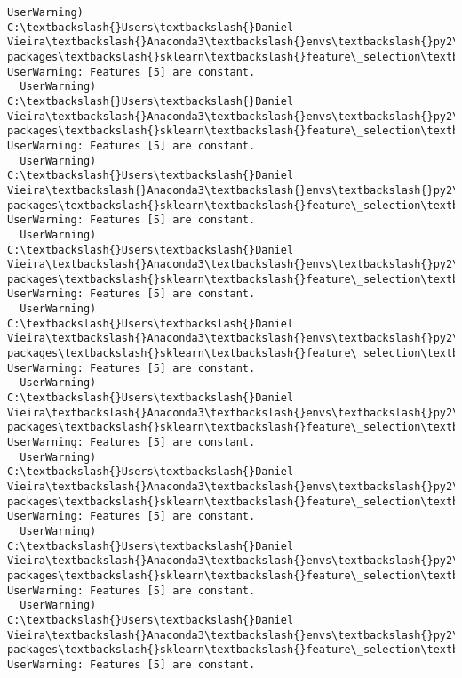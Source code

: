 \documentclass[11pt]{article}
\begin{document}
\begin{Verbatim}[commandchars=\\\{\}]
  UserWarning)
C:\textbackslash{}Users\textbackslash{}Daniel Vieira\textbackslash{}Anaconda3\textbackslash{}envs\textbackslash{}py2\textbackslash{}lib\textbackslash{}site-packages\textbackslash{}sklearn\textbackslash{}feature\_selection\textbackslash{}univariate\_selection.py:113: UserWarning: Features [5] are constant.
  UserWarning)
C:\textbackslash{}Users\textbackslash{}Daniel Vieira\textbackslash{}Anaconda3\textbackslash{}envs\textbackslash{}py2\textbackslash{}lib\textbackslash{}site-packages\textbackslash{}sklearn\textbackslash{}feature\_selection\textbackslash{}univariate\_selection.py:113: UserWarning: Features [5] are constant.
  UserWarning)
C:\textbackslash{}Users\textbackslash{}Daniel Vieira\textbackslash{}Anaconda3\textbackslash{}envs\textbackslash{}py2\textbackslash{}lib\textbackslash{}site-packages\textbackslash{}sklearn\textbackslash{}feature\_selection\textbackslash{}univariate\_selection.py:113: UserWarning: Features [5] are constant.
  UserWarning)
C:\textbackslash{}Users\textbackslash{}Daniel Vieira\textbackslash{}Anaconda3\textbackslash{}envs\textbackslash{}py2\textbackslash{}lib\textbackslash{}site-packages\textbackslash{}sklearn\textbackslash{}feature\_selection\textbackslash{}univariate\_selection.py:113: UserWarning: Features [5] are constant.
  UserWarning)
C:\textbackslash{}Users\textbackslash{}Daniel Vieira\textbackslash{}Anaconda3\textbackslash{}envs\textbackslash{}py2\textbackslash{}lib\textbackslash{}site-packages\textbackslash{}sklearn\textbackslash{}feature\_selection\textbackslash{}univariate\_selection.py:113: UserWarning: Features [5] are constant.
  UserWarning)
C:\textbackslash{}Users\textbackslash{}Daniel Vieira\textbackslash{}Anaconda3\textbackslash{}envs\textbackslash{}py2\textbackslash{}lib\textbackslash{}site-packages\textbackslash{}sklearn\textbackslash{}feature\_selection\textbackslash{}univariate\_selection.py:113: UserWarning: Features [5] are constant.
  UserWarning)
C:\textbackslash{}Users\textbackslash{}Daniel Vieira\textbackslash{}Anaconda3\textbackslash{}envs\textbackslash{}py2\textbackslash{}lib\textbackslash{}site-packages\textbackslash{}sklearn\textbackslash{}feature\_selection\textbackslash{}univariate\_selection.py:113: UserWarning: Features [5] are constant.
  UserWarning)
C:\textbackslash{}Users\textbackslash{}Daniel Vieira\textbackslash{}Anaconda3\textbackslash{}envs\textbackslash{}py2\textbackslash{}lib\textbackslash{}site-packages\textbackslash{}sklearn\textbackslash{}feature\_selection\textbackslash{}univariate\_selection.py:113: UserWarning: Features [5] are constant.
  UserWarning)
C:\textbackslash{}Users\textbackslash{}Daniel Vieira\textbackslash{}Anaconda3\textbackslash{}envs\textbackslash{}py2\textbackslash{}lib\textbackslash{}site-packages\textbackslash{}sklearn\textbackslash{}feature\_selection\textbackslash{}univariate\_selection.py:113: UserWarning: Features [5] are constant.

\end{Verbatim}
\end{document}
